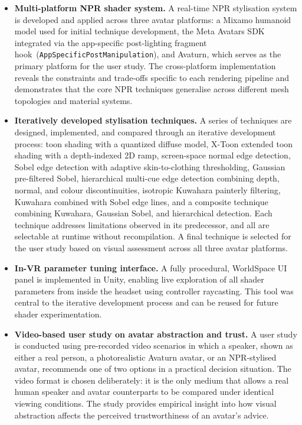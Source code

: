 \begin{itemize}
  \item \textbf{Multi-platform NPR shader system.}
    A real-time NPR stylisation system is developed and applied across three avatar platforms: a Mixamo humanoid model used for initial technique development, the Meta Avatars SDK integrated via the app-specific post-lighting fragment hook~(\texttt{AppSpecificPostManipulation}), and Avaturn, which serves as the primary platform for the user study.
    The cross-platform implementation reveals the constraints and trade-offs specific to each rendering pipeline and demonstrates that the core NPR techniques generalise across different mesh topologies and material systems.

  \item \textbf{Iteratively developed stylisation techniques.}
    A series of techniques are designed, implemented, and compared through an iterative development process:
    toon shading with a quantized diffuse model,
    X-Toon extended toon shading with a depth-indexed 2D ramp,
    screen-space normal edge detection,
    Sobel edge detection with adaptive skin-to-clothing thresholding,
    Gaussian pre-filtered Sobel,
    hierarchical multi-cue edge detection combining depth, normal, and colour discontinuities,
    isotropic Kuwahara painterly filtering,
    Kuwahara combined with Sobel edge lines,
    and a composite technique combining Kuwahara, Gaussian Sobel, and hierarchical detection.
    Each technique addresses limitations observed in its predecessor, and all are selectable at runtime without recompilation.
    A final technique is selected for the user study based on visual assessment across all three avatar platforms.

  \item \textbf{In-VR parameter tuning interface.}
    A fully procedural, WorldSpace UI panel is implemented in Unity, enabling live exploration of all shader parameters from inside the headset using controller raycasting.
    This tool was central to the iterative development process and can be reused for future shader experimentation.

  \item \textbf{Video-based user study on avatar abstraction and trust.}
    A user study is conducted using pre-recorded video scenarios in which a speaker, shown as either a real person, a photorealistic Avaturn avatar, or an NPR-stylised avatar, recommends one of two options in a practical decision situation.
    The video format is chosen deliberately: it is the only medium that allows a real human speaker and avatar counterparts to be compared under identical viewing conditions.
    The study provides empirical insight into how visual abstraction affects the perceived trustworthiness of an avatar's advice.
\end{itemize}

